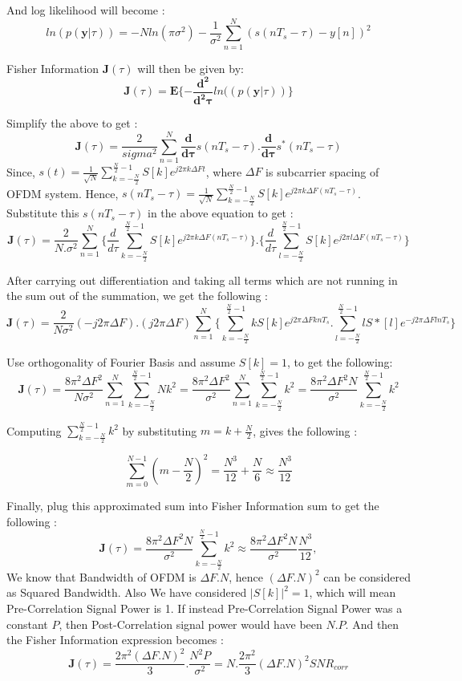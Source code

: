 \documentclass{article}
\begin{document}
And log likelihood will become :
$$ln(p(\mathbf y|\tau)) = -N ln(\pi \sigma^2) -\frac{1}{\sigma^2}\sum^{N}_{n=1}(s(nT_s - \tau) - y[n])^2$$

Fisher Information $\mathbf J(\tau)$ will then be given by:
$$\mathbf{J}(\tau) = \mathbf E\{ - \mathbf{\frac{d^2}{d^2\tau}}ln((p(\mathbf y|\tau)) \}$$

Simplify the above to get :
$$\mathbf{J}(\tau) = \frac{2}{sigma^2}\sum^{N}_{n=1}\mathbf{\frac{d}{d\tau}}s(n T_s - \tau).\mathbf{\frac{d}{d\tau}}s^*(n T_s - \tau)$$
Since, $s(t) = \frac{1}{\sqrt{N}}\sum^{\frac{N}{2} - 1}_{k=-\frac{N}{2}}S[k]e^{j2\pi k\Delta F t}$, where $\Delta F$ is subcarrier spacing of OFDM system. Hence, $s(n T_s - \tau) = \frac{1}{\sqrt{N}}\sum^{\frac{N}{2} - 1}_{k=-\frac{N}{2}}S[k]e^{j2\pi k\Delta F (n T_s - \tau)}$. Substitute this $s(n T_s - \tau)$ in the above equation to get : 
$$\mathbf{J}(\tau) = \frac{2}{N.\sigma^2} \sum^{N}_{n=1}\{\frac{d}{d\tau}\sum^{\frac{N}{2} - 1}_{k=-\frac{N}{2}}S[k]e^{j2\pi k\Delta F (n T_s - \tau)}\}.\{\frac{d}{d\tau}\sum^{\frac{N}{2} - 1}_{l=-\frac{N}{2}}S[k]e^{j2\pi l\Delta F (n T_s - \tau)}\}$$

After carrying out differentiation and taking all terms which are not running in the sum out of the summation, we get the following :
$$\mathbf{J}(\tau) = \frac{2}{N\sigma^2}(-j2\pi \Delta F).(j2\pi \Delta F)\sum^{N}_{n=1} \{\sum^{\frac{N}{2} - 1}_{k=-\frac{N}{2}}k S[k]e^{j2\pi \Delta F k n T_s}.\sum^{\frac{N}{2} - 1}_{l=-\frac{N}{2}}l S*[l]e^{-j2\pi \Delta F l n T_s}\}$$

Use orthogonality of Fourier Basis and assume $S[k] = 1$, to get the following:
$$\mathbf{J}(\tau) = \frac{8\pi^2 \Delta F^2}{N\sigma^2} \sum^{N}_{n=1} \sum^{\frac{N}{2} - 1}_{k=-\frac{N}{2}}N k^2 = \frac{8\pi^2 \Delta F^2}{\sigma^2} \sum^{N}_{n=1} \sum^{\frac{N}{2} - 1}_{k=-\frac{N}{2}}k^2 = \frac{8\pi^2 \Delta F^2 N}{\sigma^2}\sum^{\frac{N}{2} - 1}_{k=-\frac{N}{2}}k^2$$

Computing $\sum^{\frac{N}{2} - 1}_{k=-\frac{N}{2}}k^2$ by substituting $m=k+\frac{N}{2}$, gives the following :

$$\sum^{N-1}_{m=0}(m-\frac{N}{2})^2 = \frac{N^3}{12} + \frac{N}{6} \approx \frac{N^3}{12}$$

Finally, plug this approximated sum into Fisher Information sum to get the following :
$$\mathbf{J}(\tau) = \frac{8\pi^2 \Delta F^2 N}{\sigma^2}\sum^{\frac{N}{2} - 1}_{k=-\frac{N}{2}}k^2 \approx \frac{8\pi^2 \Delta F^2 N}{\sigma^2} \frac{N^3}{12},$$
We know that Bandwidth of OFDM is $\Delta F.N$, hence $(\Delta F . N)^2$ can be considered as Squared Bandwidth. Also We have considered $|S[k]|^2 = 1$, which will mean Pre-Correlation Signal Power is 1. If instead Pre-Correlation Signal Power was a constant $P$, then Post-Correlation signal power would have been $N.P$. And then the Fisher Information expression becomes :
$$\mathbf{J}(\tau) = \frac{2\pi^2 (\Delta F.N)^2}{3}. \frac{N^2 P}{\sigma^2} = N. \frac{2\pi^2}{3} (\Delta F.N)^2 SNR_{corr}$$
\end{document}
